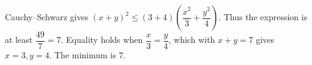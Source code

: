 Cauchy--Schwarz gives $(x+y)^2\le(3+4)\left(\dfrac{x^2}{3}+\dfrac{y^2}{4}\right)$. Thus the expression is at least $\dfrac{49}{7} = 7$. Equality holds when $\dfrac{x}{3} = \dfrac{y}{4}$, which with $x+y=7$ gives $x=3,y=4$. The minimum is $\boxed7$.
